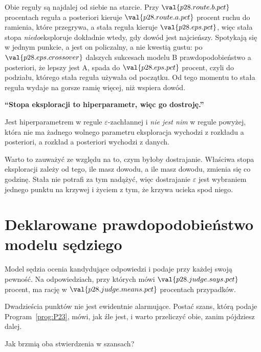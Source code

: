 \begin{fr}

Obie reguły są najdalej od siebie na starcie. Przy
$\val{p28.route.b.pct}$ procentach reguła a posteriori kieruje
$\val{p28.route.a.pct}$ procent ruchu do ramienia, które przegrywa, a stała
reguła kieruje $\val{p28.eps.pct}$, więc stała stopa
\emph{niedo}eksploruje dokładnie wtedy, gdy dowód jest najcieńszy.
Spotykają się w jednym punkcie, a jest on policzalny, a nie kwestią gustu: po
$\val{p28.eps.crossover}$ dalszych sukcesach modelu B prawdopodobieństwo a
posteriori, że lepszy jest A, spada do $\val{p28.eps.pct}$ procent, czyli do
podziału, którego stała reguła używała od początku. Od tego momentu to stała
reguła wydaje na gorsze ramię więcej, niż wspiera dowód.

\begin{trapbox}
\textbf{\enquote{Stopa eksploracji to hiperparametr, więc go dostroję.}}

Jest hiperparametrem w regule $\varepsilon$-zachłannej i \emph{nie jest nim} w
regule powyżej, która nie ma żadnego wolnego parametru \dash{} eksploracja
wychodzi z rozkładu a posteriori, a rozkład a posteriori wychodzi z danych.

Warto to zauważyć ze względu na to, czym byłoby dostrajanie. Właściwa stopa
eksploracji zależy od tego, ile masz dowodu, a ile masz dowodu, zmienia się co
godzinę. Stała nie potrafi za tym nadążyć, więc dostrajanie
$\varepsilon$ jest wybraniem jednego punktu na krzywej i życiem z tym, że
krzywa ucieka spod niego.
\end{trapbox}
\end{fr}

\section{Deklarowane prawdopodobieństwo modelu sędziego}
\label{sec:P28-judge}

\begin{fr}
Model sędzia ocenia kandydujące odpowiedzi i podaje przy każdej swoją pewność.
Na odpowiedziach, przy których mówi $\val{p28.judge.says.pct}$ procent, ma
rację w $\val{p28.judge.means.pct}$ procentach przypadków.

Dwadzieścia punktów nie jest ewidentnie alarmujące. Postać szans, którą podaje
Program~\ref{prog:P23}, mówi, jak źle jest, i warto przeliczyć obie, zanim
pójdziesz dalej.

Jak brzmią oba stwierdzenia w szansach?
\dotline
\nextframe
\end{fr}

